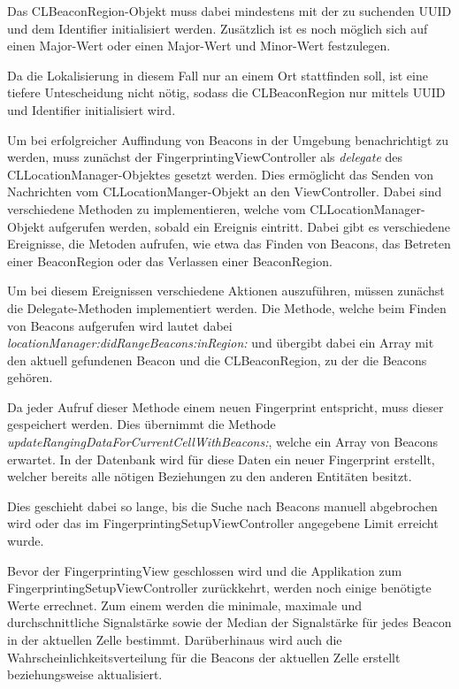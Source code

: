 Das CLBeaconRegion-Objekt muss dabei mindestens mit der zu suchenden UUID und dem Identifier initialisiert werden. Zusätzlich ist es noch möglich sich auf einen Major-Wert oder einen Major-Wert und Minor-Wert festzulegen. 

Da die Lokalisierung in diesem Fall nur an einem Ort stattfinden soll, ist eine tiefere Untescheidung nicht nötig, sodass die CLBeaconRegion nur mittels UUID und Identifier initialisiert wird. 

Um bei erfolgreicher Auffindung von Beacons in der Umgebung benachrichtigt zu werden, muss zunächst der FingerprintingViewController als \emph{delegate} des CLLocationManager-Objektes gesetzt werden. 
Dies ermöglicht das Senden von Nachrichten vom CLLocationManger-Objekt an den ViewController. Dabei sind verschiedene Methoden zu implementieren, welche vom CLLocationManager-Objekt aufgerufen werden, sobald ein Ereignis eintritt. Dabei gibt es verschiedene Ereignisse, die Metoden aufrufen, wie etwa das Finden von Beacons, das Betreten einer BeaconRegion oder das Verlassen einer BeaconRegion. 

Um bei diesem Ereignissen verschiedene Aktionen auszuführen, müssen zunächst die Delegate-Methoden implementiert werden. Die Methode, welche beim Finden von Beacons aufgerufen wird lautet dabei \emph{locationManager:didRangeBeacons:inRegion:} und übergibt dabei ein Array mit den aktuell gefundenen Beacon und die CLBeaconRegion, zu der die Beacons gehören.

Da jeder Aufruf dieser Methode einem neuen Fingerprint entspricht, muss dieser gespeichert werden. 
Dies übernimmt die Methode \emph{updateRangingDataForCurrentCellWithBeacons:}, welche ein Array von Beacons erwartet. In der Datenbank wird für diese Daten ein neuer Fingerprint erstellt, welcher bereits alle nötigen Beziehungen zu den anderen Entitäten besitzt. 

Dies geschieht dabei so lange, bis die Suche nach Beacons manuell abgebrochen wird oder das im FingerprintingSetupViewController angegebene Limit erreicht wurde. 

Bevor der FingerprintingView geschlossen wird und die Applikation zum FingerprintingSetupViewController zurückkehrt, werden noch einige benötigte Werte errechnet.
Zum einem werden die minimale, maximale und durchschnittliche Signalstärke sowie der Median der Signalstärke für jedes Beacon in der aktuellen Zelle bestimmt. 
Darüberhinaus wird auch die Wahrscheinlichkeitsverteilung für die Beacons der aktuellen Zelle erstellt beziehungsweise aktualisiert.

